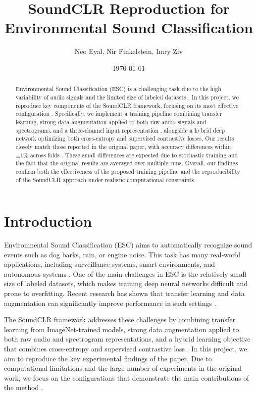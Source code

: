 \documentclass[twocolumn, 10pt]{article}
\title{SoundCLR Reproduction for Environmental Sound Classification}
\author{Neo Eyal, Nir Finkelstein, Imry Ziv}
\date{\today}
\begin{document}
\maketitle

\begin{abstract}
Environmental Sound Classification (ESC) is a challenging task due to the high variability of audio signals and the limited size of labeled datasets \cite{piczak2015esc}. In this project, we reproduce key components of the SoundCLR framework, focusing on its most effective configuration \cite[Sec. IV]{soundclr}. Specifically, we implement a training pipeline combining transfer learning, strong data augmentation applied to both raw audio signals and spectrograms, and a three-channel input representation \cite[Sec. III-A]{soundclr}, alongside a hybrid deep network optimizing both cross-entropy and supervised contrastive losses. Our results closely match those reported in the original paper, with accuracy differences within $\pm 1\%$ across folds \cite[Fig. 4]{soundclr}. These small differences are expected due to stochastic training and the fact that the original results are averaged over multiple runs. Overall, our findings confirm both the effectiveness of the proposed training pipeline and the reproducibility of the SoundCLR approach under realistic computational constraints.
\end{abstract}

\section{Introduction}
Environmental Sound Classification (ESC) aims to automatically recognize sound events such as dog barks, rain, or engine noise. This task has many real-world applications, including surveillance systems, smart environments, and autonomous systems \cite{li2007robot, radhakrishnan2005audio, intani2013crime}. One of the main challenges in ESC is the relatively small size of labeled datasets, which makes training deep neural networks difficult and prone to overfitting. Recent research has shown that transfer learning and data augmentation can significantly improve performance in such settings \cite{salamon2017deep}.

The SoundCLR framework addresses these challenges by combining transfer learning from ImageNet-trained models, strong data augmentation applied to both raw audio and spectrogram representations, and a hybrid learning objective that combines cross-entropy and supervised contrastive loss \cite[Sec. III]{soundclr}. In this project, we aim to reproduce the key experimental findings of the paper. Due to computational limitations and the large number of experiments in the original work, we focus on the configurations that demonstrate the main contributions of the method \cite[Sec. IV]{soundclr}.
\end{document}
